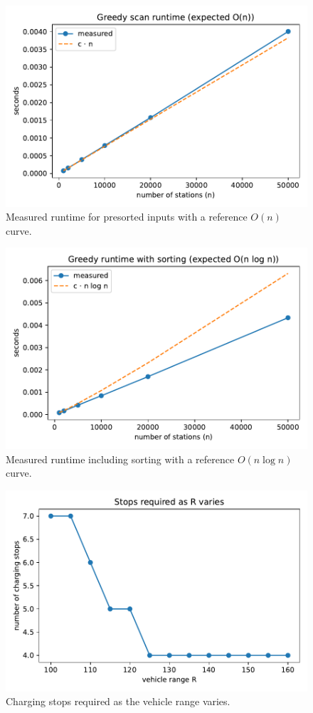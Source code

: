 \begin{figure}[ht]
\centering
\includegraphics[width=\linewidth]{Greedy/figures/runtime_vs_n_sorted.pdf}
\caption{Measured runtime for presorted inputs with a reference $O(n)$ curve.}
\label{fig:runtime-sorted}
\end{figure}

\begin{figure}[ht]
\centering
\includegraphics[width=\linewidth]{Greedy/figures/runtime_vs_n_unsorted.pdf}
\caption{Measured runtime including sorting with a reference $O(n \log n)$ curve.}
\label{fig:runtime-unsorted}
\end{figure}

\begin{figure}[ht]
\centering
\includegraphics[width=\linewidth]{Greedy/figures/stops_vs_R.pdf}
\caption{Charging stops required as the vehicle range varies.}
\label{fig:stops-vs-r}
\end{figure}
